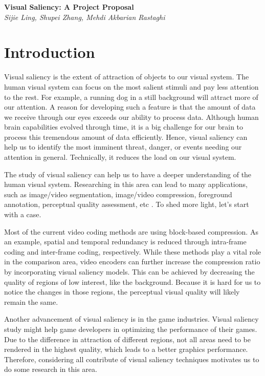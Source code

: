 \documentclass[12pt]{article}
\begin{document}
\begin{center}
{\bf \Large Visual Saliency: A Project Proposal}  \\
\vspace{.1in}
{\em Sijie Ling, Shupei Zhang, Mehdi Akbarian Rastaghi}
\end{center}
\section{Introduction}

Visual saliency is the extent of attraction of objects to our visual system. 
The human visual system can focus on the most salient stimuli and pay less attention to the rest. 
For example, a running dog in a still background will attract more of our attention. 
A reason for developing such a feature is that the amount of data we receive through our eyes exceeds our ability to process data. 
Although human brain capabilities evolved through time, it is a big challenge for our brain to process this tremendous amount of data efficiently. 
Hence, visual saliency can help us to identify the most imminent threat, danger, or events needing our attention in general. 
Technically, it reduces the load on our visual system. 

The study of visual saliency can help us to have a deeper understanding of the human visual system. 
Researching in this area can lead to many applications, such as image/video segmentation, image/video compression, foreground annotation, perceptual quality assessment, etc \cite{congReviewVisualSaliency2019}.  
To shed more light, let's start with a case. 

Most of the current video coding methods are using block-based compression. 
As an example, spatial and temporal redundancy is reduced through intra-frame coding and inter-frame coding, respectively\cite{sullivanOverviewHighEfficiency2012}. 
While these methods play a vital role in the comparison area, video encoders can further increase the compression ratio by incorporating visual saliency models. 
This can be achieved by decreasing the quality of regions of low interest, like the background. 
Because it is hard for us to notice the changes in those regions, the perceptual visual quality will likely remain the same.

Another advancement of visual saliency is in the game industries. 
Visual saliency study might help game developers in optimizing the performance of their games. 
Due to the difference in attraction of different regions, not all areas need to be rendered in the highest quality, which leads to a better graphics performance. 
Therefore, considering all contribute of visual saliency techniques motivates us to do some research in this area. 
\end{document}
